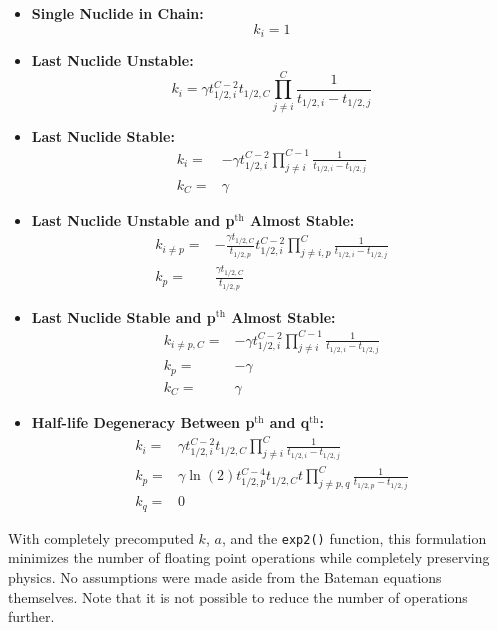 \documentclass[letterpaper]{physor2018}
\newcommand{\pth}{p$^{\mathrm{th}}$\xspace}
\newcommand{\qth}{q$^{\mathrm{th}}$\xspace}
\begin{document}
\begin{itemize}
\item \textbf{Single Nuclide in Chain:}
\begin{equation}
\label{k-bin-single}
    k_i = 1
\end{equation}
\item \textbf{Last Nuclide Unstable:}
\begin{equation}
\label{k-bin-unstable}
    k_i = \gamma t_{1/2,i}^{C-2} t_{1/2,C} \prod_{j\ne i}^{C} \frac{1}{t_{1/2,i} - t_{1/2,j}}
\end{equation}
\item \textbf{Last Nuclide Stable:}
\begin{equation}
\label{k-bin-stable-0}
\begin{split}
    k_i = & -\gamma t_{1/2,i}^{C-2} \prod_{j\ne i}^{C-1} \frac{1}{t_{1/2,i} - t_{1/2,j}} \\
    k_C = & \gamma
\end{split}
\end{equation}
\item \textbf{Last Nuclide Unstable and \pth Almost Stable:}
\begin{equation}
\label{k-bin-unstable-p-almost-0}
\begin{split}
    k_{i\ne p} = & -\frac{\gamma t_{1/2,C}}{t_{1/2,p}} t_{1/2,i}^{C-2} \prod_{j\ne i,p}^C \frac{1}{t_{1/2,i} - t_{1/2,j}} \\
    k_p = & \frac{\gamma t_{1/2,C}}{t_{1/2,p}}
\end{split}
\end{equation}
\item \textbf{Last Nuclide Stable and \pth Almost Stable:}
\begin{equation}
\label{k-bin-stable-p-almost-0}
\begin{split}
    k_{i\ne p,C} = & -\gamma t_{1/2,i}^{C-2} \prod_{j\ne i}^{C-1} \frac{1}{t_{1/2,i} - t_{1/2,j}} \\
    k_p = & -\gamma \\
    k_C = & \gamma
\end{split}
\end{equation}
\item \textbf{Half-life Degeneracy Between \pth and \qth:}
\begin{equation}
\label{k-bin-pq-degen-0}
\begin{split}
    k_i = & \gamma t_{1/2,i}^{C-2} t_{1/2,C} \prod_{j\ne i}^{C} \frac{1}{t_{1/2,i} - t_{1/2,j}} \\
    k_p = & \gamma\ln(2) t_{1/2,p}^{C-4} t_{1/2,C}  t \prod_{j\ne p,q}^C \frac{1}{t_{1/2,p} - t_{1/2,j}} \\
    k_q = & 0
\end{split}
\end{equation}
\end{itemize}
With completely precomputed $k$, $a$, and the \texttt{exp2()} function, this
formulation minimizes the number of floating point operations while completely
preserving physics. No assumptions were made aside from the Bateman equations
themselves.
Note that it is not possible to reduce the number of operations further.
\end{document}
